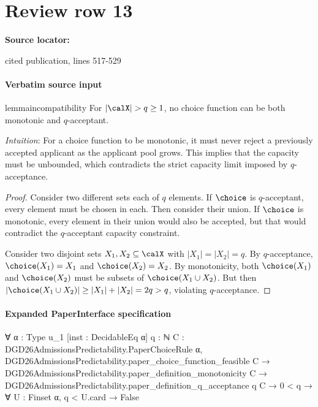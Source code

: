 \documentclass[10pt]{article}
\begin{document}
\section*{Review row 13}
\textbf{Source locator:} {\footnotesize\raggedright cited publication, lines 517-\allowbreak{}529\par}
\paragraph{Verbatim source input}
\begin{ReviewVerbatim}
\begin{restatable}{lemma}{incompatibility}
\label{thm:mono-accept-mutex}
For $|\calX| > q \geq 1$, no choice function can be both monotonic and $q$-acceptant.
\end{restatable}

\textit{Intuition}: %
For a choice function to be monotonic, it must never reject a previously accepted applicant as the applicant pool grows. This implies that the capacity must be unbounded, which contradicts the strict capacity limit imposed by $q$-acceptance.%

\begin{proof}
Consider two different sets each of $q$ elements. If $\choice$ is $q$-acceptant, every element must be chosen in each. Then consider their union. If $\choice$ is monotonic, every element in their union would also be accepted, but that would contradict the $q$-acceptant capacity constraint.

Consider two disjoint sets $X_1, X_2 \subseteq \calX$ with $|X_1| = |X_2| = q$. By $q$-acceptance, $\choice(X_1) = X_1$ and $\choice(X_2) = X_2$. By monotonicity, both $\choice(X_1)$ and $\choice(X_2)$ must be subsets of $\choice(X_1 \cup X_2)$. But then $|\choice(X_1 \cup X_2)| \geq |X_1| + |X_2| = 2q > q$, violating $q$-acceptance.
\end{proof}
\end{ReviewVerbatim}



\paragraph{Expanded PaperInterface specification}
\begin{ReviewVerbatim}
∀ {α : Type u_1} [inst : DecidableEq α] {q : ℕ} {C : DGD26AdmissionsPredictability.PaperChoiceRule α},
  DGD26AdmissionsPredictability.paper_choice_function_feasible C →
    DGD26AdmissionsPredictability.paper_definition_monotonicity C →
      DGD26AdmissionsPredictability.paper_definition_q_acceptance q C → 0 < q → ∀ {U : Finset α}, q < U.card → False
\end{ReviewVerbatim}
\end{document}
